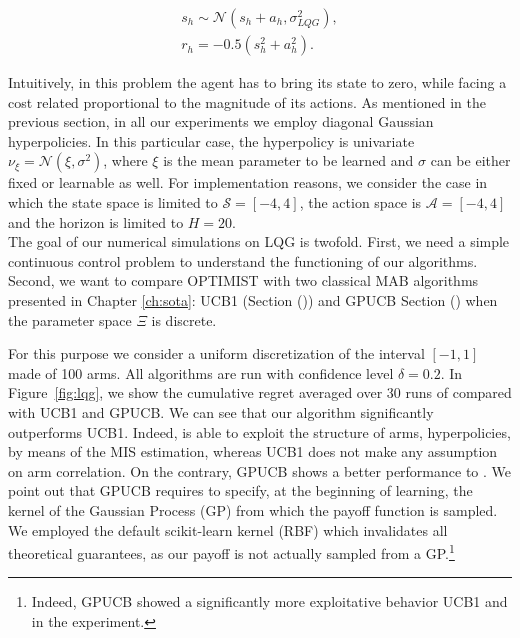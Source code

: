 \begin{align}
s_h\sim\mathcal{N}(s_h + a_h, \sigma_{LQG}^2), \\
r_h=-0.5(s_h^2 + a_h^2).
\end{align}

Intuitively, in this problem the agent has to bring its state to zero, while facing a cost related proportional to the magnitude of its actions. 
As mentioned in the previous section, in all our experiments we employ diagonal Gaussian hyperpolicies. In this particular case, the hyperpolicy is univariate $\nu_{\xi} = \mathcal{N}( \xi, \sigma^2)$, where $\xi$ is the mean parameter to be learned and $\sigma$ can be either fixed or learnable as well.
For implementation reasons, we consider the case in which the state space is limited to $\mathcal{S}=[-4,4]$, the action space is $\mathcal{A}=[-4,4]$ and the horizon is limited to $H=20$. \\
The goal of our numerical simulations on \gls{LQG} is twofold. First, we need a simple continuous control problem to understand the functioning of our algorithms. Second, we want to compare \gls{OPTIMIST} with two classical \gls{MAB} algorithms presented in Chapter \ref{ch:sota}: \gls{UCB}1 (Section ()) and \gls{GPUCB} Section () when the parameter space $\Xi$ is discrete. 

For this purpose we consider a uniform discretization of the interval $[-1,1]$ made of 100 arms. All algorithms are run with confidence level $\delta=0.2$.
In Figure~\ref{fig:lqg}, we show the cumulative regret averaged over 30 runs of \algoname compared with UCB1 and GPUCB. We can see that our algorithm significantly outperforms UCB1. Indeed, \algoname is able to exploit the structure of arms, \ie hyperpolicies, by means of the MIS estimation, whereas UCB1 does not make any assumption on arm correlation. On the contrary, GPUCB shows a better performance \wrt to \algoname. We point out that GPUCB requires to specify, at the beginning of learning, the kernel of the Gaussian Process (GP) from which the payoff function is sampled. We employed the default scikit-learn kernel (RBF) which invalidates all theoretical guarantees, as our payoff is not actually sampled from a GP.\footnote{Indeed, GPUCB showed a significantly more exploitative behavior \wrt UCB1 and \algoname in the experiment.}